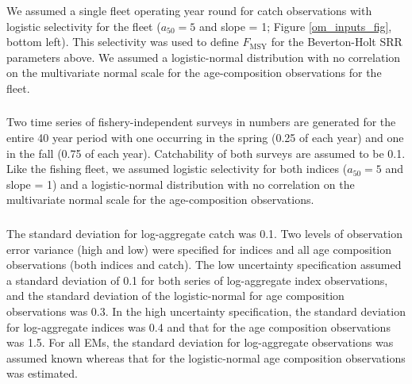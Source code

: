 \documentclass[
  12pt,
]{article}
\newcommand{\Fmsy}{\ensuremath{F_{\text{MSY}}}\xspace}
\providecommand{\DIFadd}[1]{{\protect\color{blue}\uwave{#1}}} %
\providecommand{\DIFaddbegin}{} %
\providecommand{\DIFaddend}{} %
\providecommand{\DIFdelbegin}{} %
\providecommand{\DIFdelend}{} %
\newcommand{\DIFscaledelfig}{0.5}
\newlength{\DIFdelgraphicswidth} %
\newlength{\DIFdelgraphicsheight} %
\newcommand{\DIFaddincludegraphics}[2][]{{\color{blue}\fbox{\DIFOincludegraphics[#1]{#2}}}} %
\newcommand{\DIFdelincludegraphics}[2][]{%
\sbox{\DIFdelgraphicsbox}{\DIFOincludegraphics[#1]{#2}}%
\settoboxwidth{\DIFdelgraphicswidth}{\DIFdelgraphicsbox} %
\settoboxtotalheight{\DIFdelgraphicsheight}{\DIFdelgraphicsbox} %
\scalebox{\DIFscaledelfig}{%
\parbox[b]{\DIFdelgraphicswidth}{\usebox{\DIFdelgraphicsbox}\\[-\baselineskip] \rule{\DIFdelgraphicswidth}{0em}}\llap{\resizebox{\DIFdelgraphicswidth}{\DIFdelgraphicsheight}{%
\setlength{\unitlength}{\DIFdelgraphicswidth}%
\begin{picture}(1,1)%
\thicklines\linethickness{2pt} %
{\color[rgb]{1,0,0}\put(0,0){\framebox(1,1){}}}%
{\color[rgb]{1,0,0}\put(0,0){\line( 1,1){1}}}%
{\color[rgb]{1,0,0}\put(0,1){\line(1,-1){1}}}%
\end{picture}%
}\hspace*{3pt}}} %
} %
\DeclareRobustCommand{\DIFaddbegin}{\DIFOaddbegin \let\includegraphics\DIFaddincludegraphics} %
\DeclareRobustCommand{\DIFaddend}{\DIFOaddend \let\includegraphics\DIFOincludegraphics} %
\DeclareRobustCommand{\DIFdelbegin}{\DIFOdelbegin \let\includegraphics\DIFdelincludegraphics} %
\DeclareRobustCommand{\DIFdelend}{\DIFOaddend \let\includegraphics\DIFOincludegraphics} %
\begin{document}
We assumed a single fleet operating year round for catch observations
with logistic selectivity for the fleet (\(a_{50} = 5\) and slope = 1;
Figure \ref{om_inputs_fig}, bottom left). This selectivity was used to
define \Fmsy for the Beverton-Holt SRR parameters above. We assumed a
logistic-normal distribution with no correlation on the multivariate
normal scale for the age-composition observations for the fleet.

\DIFdelbegin %
\DIFdelend \DIFaddbegin \subsubsection*{\DIFadd{Indices}}\label{indices}
\DIFaddend {}

Two time series of fishery-independent surveys in numbers are generated
for the entire 40 year period with one occurring in the spring (0.25 of
each year) and one in the fall (0.75 of each year). Catchability of both
surveys are assumed to be 0.1. Like the fishing fleet, we assumed
logistic selectivity for both indices (\(a_{50} = 5\) and slope = 1) and
a logistic-normal distribution with no correlation on the multivariate
normal scale for the age-composition observations.

\DIFdelbegin %
\DIFdelend \DIFaddbegin \subsubsection*{\DIFadd{Observation Uncertainty}}\label{observation-uncertainty}
\DIFaddend {}

The standard deviation for log-aggregate catch was 0.1. Two levels of
observation error variance (high and low) were specified for indices and
all age composition observations (both indices and catch). The low
uncertainty specification assumed a standard deviation of 0.1 for both
series of log-aggregate index observations, and the standard deviation
of the logistic-normal for age composition observations was 0.3. In the
high uncertainty specification, the standard deviation for log-aggregate
indices was 0.4 and that for the age composition observations was 1.5.
For all EMs, the standard deviation for log-aggregate observations was
assumed known whereas that for the logistic-normal age composition
observations was estimated.
\end{document}
